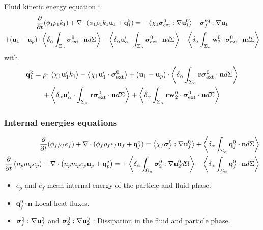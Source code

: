 \documentclass{sintefbeamer}
\begin{document}
\begin{frame}
  {Fluid kinetic energy equation :}
  \small
  \begin{multline*}
    \frac{\partial}{\partial t} (\phi_1\rho_1k_1)  
    + \mathbf{\nabla}\cdot (
      \phi_1\rho_1k_1\textbf{u}_1
      + \textbf{q}_1^\text{k} 
      )
      = 
      - \left<\chi_1\bm{\sigma}_\text{ext}^0 : \mathbf{\nabla} \textbf{u}_1^0\right>
      - \bm{\sigma}_f^\text{eq} : \mathbf{\nabla} \textbf{u}_1\\
      + (\textbf{u}_1 - \textbf{u}_p)
      \cdot \left<\delta_\alpha \int_{\Sigma_\alpha} {\bm{\sigma}_\text{ext}^0 \cdot \textbf{n}} d\Sigma\right>
      - \left<\delta_\alpha  \textbf{u}_\alpha' \cdot \int_{\Sigma_\alpha}   \bm{\sigma}_\text{ext}^0 \cdot \textbf{n} d\Sigma\right>
      - \left<\delta_\alpha  \int_{\Sigma_\alpha} \textbf{w}_2^0 \cdot \bm{\sigma}_\text{ext}^0 \cdot \textbf{n} d\Sigma\right> 
  \end{multline*}
  with, 
  \begin{multline*}
    \textbf{q}_1^\text{k}
      = \rho_1 \left<\chi_1 \textbf{u}_1' k_1\right> 
      - \left<\chi_1 \textbf{u}_1' \cdot \bm{\sigma}_\text{ext}^0\right>
      + (\textbf{u}_1 - \textbf{u}_p)\cdot
      \left<\delta_\alpha \int_{\Sigma_\alpha} {\textbf{r}\bm{\sigma}_\text{ext}^0 \cdot \textbf{n}} d\Sigma\right>\\
      + \left<\delta_\alpha  \textbf{u}_\alpha' \cdot \int_{\Sigma_\alpha}  \textbf{r} \bm{\sigma}_\text{ext}^0 \cdot \textbf{n} d\Sigma\right>
      + \left<\delta_\alpha  \int_{\Sigma_\alpha} \textbf{r}\textbf{w}_2^0 \cdot \bm{\sigma}_\text{ext}^0 \cdot \textbf{n} d\Sigma\right>
  \end{multline*}
\end{frame}


\begin{frame}
  \frametitle{Internal energies equations}
\begin{align*}
  \frac{\partial}{\partial t} (\phi_f\rho_fe_f)  
  + \mathbf{\nabla}\cdot (
      \phi_f \rho_fe_f\textbf{u}_f
      +
      \textbf{q}_f^\text{e} 
      )
  = 
  \left<\chi_f\bm{\sigma}_f^0 : \mathbf{\nabla} \textbf{u}_f^0\right>
  + \left<\delta_\alpha \int_{\Sigma_\alpha} {\textbf{q}_f^0 \cdot \textbf{n}} d\Sigma\right> \\
  \frac{\partial}{\partial t} \left(n_p m_p e_p\right)
  + \mathbf{\nabla}\cdot \left(n_p
  m_p e_p \textbf{u}_p 
  +  \textbf{q}_p^\text{e}
  \right)
  = 
  + \left<\delta_\alpha \int_{\Omega_\alpha} {\bm{\sigma}_2^0 : \mathbf{\nabla}\textbf{u}_2^0} d\Omega\right>
  - \left<\delta_\alpha \int_{\Sigma_\alpha} {\textbf{q}_f^0\cdot \textbf{n}} d\Sigma\right>
\end{align*}
  
\begin{itemize}
  \item $e_p$ and $e_f$ mean internal energy of the particle  and fluid phase. 
  \item $\textbf{q}_f^0\cdot \textbf{n}$ Local heat fluxes.
  \item $\bm{\sigma}_f^0 : \mathbf{\nabla} \textbf{u}_f^0$ and $\bm{\sigma}_2^0 : \mathbf{\nabla} \textbf{u}_2^0$ : Dissipation in the fluid and particle phase. 
\end{itemize}
\end{frame}
\end{document}
